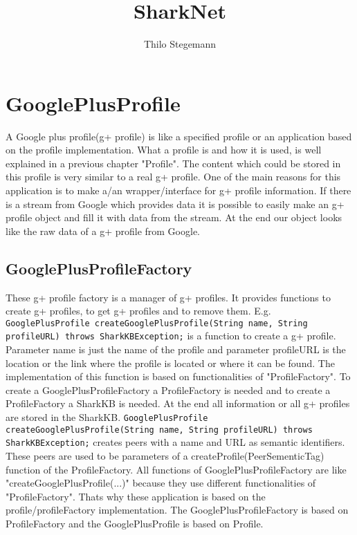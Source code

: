 \documentclass[12pt]{article}
\begin{document}
\title{SharkNet}
\maketitle
\author{Thilo Stegemann}
\section{GooglePlusProfile}
\label{sec:knowledgePorts:GooglePlusProfile}

A Google plus profile(g+ profile) is like a specified profile or an application based on the profile implementation. What a profile is and how it is used, is well explained in a previous chapter "Profile". The content which could be stored in this profile is very similar to a real g+ profile. One of the main reasons for this application is to make a/an wrapper/interface for g+ profile information. If there is a stream from Google which provides data it is possible to easily make an g+ profile object and fill it with data from the stream. At the end our object looks like the raw data of a g+ profile from Google. 

\subsection{GooglePlusProfileFactory}

These g+ profile factory is a manager of g+ profiles. It provides functions to create g+ profiles, to get g+ profiles and to remove them. E.g. {\tt GooglePlusProfile createGooglePlusProfile(String name, String profileURL) throws SharkKBException;} is a function to create a g+ profile. Parameter name is just the name of the profile and parameter profileURL is the location or the link where the profile is located or where it can be found. The implementation of this function is based on functionalities of "ProfileFactory". To create a GooglePlusProfileFactory a ProfileFactory is needed and to create a ProfileFactory a SharkKB is needed. At the end all information or all g+ profiles are stored in the SharkKB.  {\tt GooglePlusProfile createGooglePlusProfile(String name, String profileURL) throws SharkKBException;} creates peers with a name and URL as semantic identifiers. These peers are used to be parameters of a createProfile(PeerSementicTag) function of the ProfileFactory. All functions of GooglePlusProfileFactory are like "createGooglePlusProfile(...)" because they use different functionalities of "ProfileFactory". Thats why these application is based on the profile/profileFactory implementation. The GooglePlusProfileFactory is based on ProfileFactory and the GooglePlusProfile is based on Profile.
\end{document}
